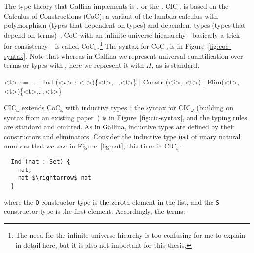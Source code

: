 The type theory that Gallina implements is , or the .
CIC$_{\omega}$ is based on the Calculus of Constructions (CoC), a variant of the lambda calculus with polymorphism (types that dependent on types) and dependent types (types that depend on terms)~\cite{coquand:inria-00076024}.
CoC with an infinite universe hieararchy---basically a trick for consistency---is 
called CoC$_{\omega}$.\footnote{The need for the infinite universe hiearchy is too confusing for me to explain in detail here, but it is also not important for this thesis.}
The syntax for CoC$_{\omega}$ is in Figure~\ref{fig:coc-syntax}.
Note that whereas in Gallina we represent universal quantification over terms or types with \ltacforall, here we represent it with $\Pi$, as is standard.

\begin{figure*}
\small
\begin{grammar}
<t> ::= ... | \hspace{0.06cm} Ind (<v> : <t>)\{<t>,\ldots,<t>\} \hspace{0.06cm} | \hspace{0.06cm} Constr (<i>, <t>) \hspace{0.06cm} | \hspace{0.06cm} Elim(<t>, <t>)\{<t>,\ldots,<t>\}
\end{grammar}
\vspace{-0.3cm}
\caption{CIC$_\omega$ is CoC$_\omega$ with inductive types, inductive constructors, and .}
\label{fig:cic-syntax}
\end{figure*}

CIC$_{\omega}$ extends CoC$_{\omega}$ with inductive types~\cite{inductive};
the syntax for CIC$_{\omega}$ (building on syntax from an existing paper~\cite{Timany2015FirstST}) is in Figure~\ref{fig:cic-syntax},
and the typing rules are standard and omitted.
As in Gallina, inductive types are defined by their constructors and eliminators.
Consider the inductive type \lstinline{nat} of unary natural numbers that we saw in Figure~\ref{fig:nat},
this time in CIC$_{\omega}$: %

\begin{lstlisting}
  Ind (nat : Set) {
    nat,
    nat $\rightarrow$ nat
  }
\end{lstlisting}
where the \lstinline{O} constructor type is the zeroth element in the list, and the \lstinline{S} constructor type is the first element.
Accordingly, the terms:

